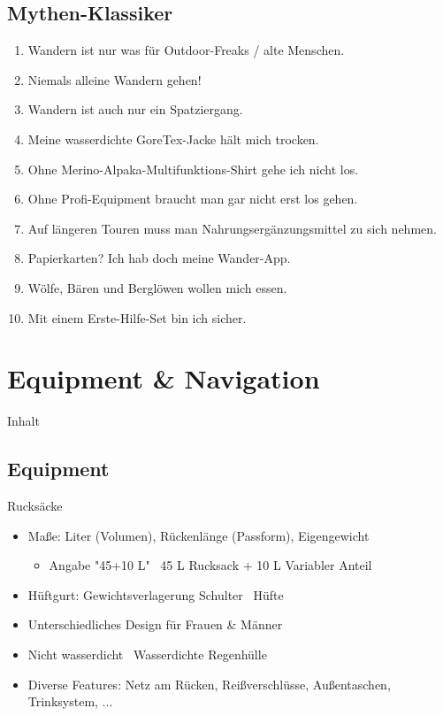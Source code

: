 \documentclass[aspectratio=169]{beamer}
\begin{document}
		\subsection{Mythen-Klassiker}
			
			\begin{frame}{}
				\begin{enumerate}
					\item Wandern ist nur was für Outdoor-Freaks / alte Menschen.\pause
					\item Niemals alleine Wandern gehen!\pause
					\item Wandern ist auch nur ein Spatziergang.\pause
					\item Meine wasserdichte GoreTex-Jacke hält mich trocken.\pause
					\item Ohne Merino-Alpaka-Multifunktions-Shirt gehe ich nicht los.\pause
					\item Ohne Profi-Equipment braucht man gar nicht erst los gehen.\pause
					\item Auf längeren Touren muss man Nahrungsergänzungsmittel zu sich nehmen.\pause
					\item Papierkarten? Ich hab doch meine Wander-App.\pause
					\item Wölfe, Bären und Berglöwen wollen mich essen.\pause
					\item Mit einem Erste-Hilfe-Set bin ich sicher.
				\end{enumerate}
			\end{frame}
			
	\section{Equipment \& Navigation}
		
		\begin{frame}[t]{Inhalt}
		\end{frame}
		
		\subsection{Equipment}
		
			\begin{frame}{Rucksäcke}
				\begin{itemize}
					\item Maße: Liter (Volumen), Rückenlänge (Passform), Eigengewicht
					\begin{itemize}
						\item Angabe "45+10 L" \textrightarrow\ 45 L Rucksack + 10 L Variabler Anteil
					\end{itemize}\pause
					\item Hüftgurt: Gewichtsverlagerung Schulter \textrightarrow\ Hüfte\pause
					\item Unterschiedliches Design für Frauen \& Männer\pause
					\item Nicht wasserdicht \textrightarrow\ Wasserdichte Regenhülle\pause
					\item Diverse Features: Netz am Rücken, Reißverschlüsse, Außentaschen, Trinksystem, ...
				\end{itemize}
			\end{frame}
			
\end{document}
